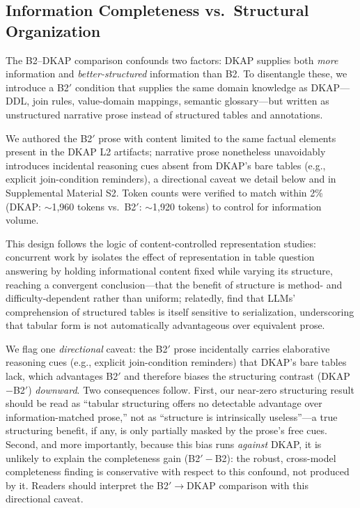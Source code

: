 \documentclass[fleqn,10pt,lineno]{wlpeerj}
\begin{document}
\subsection{Information Completeness vs.\ Structural Organization}
\label{sec:b2prime}

The B2--DKAP comparison confounds two factors: DKAP supplies both \textit{more} information and \textit{better-structured} information than B2. To disentangle these, we introduce a B2$'$ condition that supplies the same domain knowledge as DKAP---DDL, join rules, value-domain mappings, semantic glossary---but written as unstructured narrative prose instead of structured tables and annotations.

We authored the B2$'$ prose with content limited to the same factual elements present in the DKAP L2 artifacts; narrative prose nonetheless unavoidably introduces incidental reasoning cues absent from DKAP's bare tables (e.g., explicit join-condition reminders), a directional caveat we detail below and in Supplemental Material S2. Token counts were verified to match within 2\% (DKAP: ${\sim}$1{,}960 tokens vs.\ B2$'$: ${\sim}$1{,}920 tokens) to control for information volume.

This design follows the logic of content-controlled representation studies: concurrent work by \citet{zhang2026samecontent} isolates the effect of representation in table question answering by holding informational content fixed while varying its structure, reaching a convergent conclusion---that the benefit of structure is method- and difficulty-dependent rather than uniform; relatedly, \citet{sui2024table} find that LLMs' comprehension of structured tables is itself sensitive to serialization, underscoring that tabular form is not automatically advantageous over equivalent prose.

We flag one \textit{directional} caveat: the B2$'$ prose incidentally carries elaborative reasoning cues (e.g., explicit join-condition reminders) that DKAP's bare tables lack, which advantages B2$'$ and therefore biases the structuring contrast (DKAP$-$B2$'$) \textit{downward}. Two consequences follow. First, our near-zero structuring result should be read as ``tabular structuring offers no detectable advantage over information-matched prose,'' not as ``structure is intrinsically useless''---a true structuring benefit, if any, is only partially masked by the prose's free cues. Second, and more importantly, because this bias runs \textit{against} DKAP, it is unlikely to explain the completeness gain (B2$'-$B2): the robust, cross-model completeness finding is conservative with respect to this confound, not produced by it. Readers should interpret the B2$'\!\to\!$DKAP comparison with this directional caveat.
\end{document}
